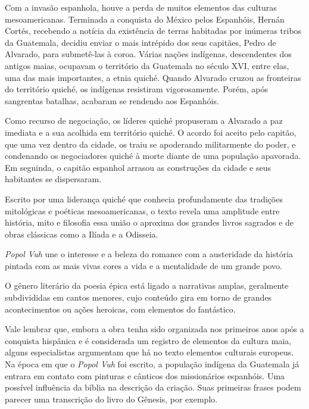 \documentclass[12pt]{extarticle}
\begin{document}
Com a invasão espanhola, houve a perda de muitos elementos das culturas mesoamericanas. Terminada a conquista do México pelos Espanhóis, Hernán Cortés, recebendo a notícia da existência de terras habitadas por inúmeras tribos da Guatemala, decidiu enviar o mais intrépido dos seus capitães, Pedro de Alvarado, para submetê-las à coroa.
Várias nações indígenas, descendentes dos antigos maias, ocupavam o território da Guatemala no século XVI, entre elas, uma das mais importantes, a etnia quiché. Quando Alvarado cruzou as fronteiras do território quiché, os indígenas resistiram vigorosamente. Porém, após sangrentas batalhas, acabaram se rendendo aos Espanhóis.

Como recurso de negociação, os líderes quiché propuseram a Alvarado a paz imediata e a sua acolhida em território quiché. O acordo foi aceito pelo capitão, que uma vez dentro da cidade, os traiu se apoderando militarmente do poder, e condenando os negociadores quiché à morte diante de uma população apavorada.
Em seguinda, o capitão espanhol arrasou as construções da cidade e seus habitantes se dispersaram.





Escrito por uma liderança quiché que conhecia profundamente das tradições mitológicas e poéticas mesoamericanas, o texto revela uma amplitude entre história, mito e filosofia essa união o aproxima dos grandes livros sagrados e de obras clássicas como a Ilíada e a Odisseia.

\textit{Popol Vuh} une o interesse e a beleza do romance com a austeridade da história pintada com as mais vivas cores a vida e a mentalidade de um grande povo.

O gênero literário da poesia épica está ligado a narrativas amplas, geralmente subdivididas em cantos menores, cujo conteúdo gira em torno de grandes acontecimentos ou ações heroicas, com elementos do fantástico.

Vale lembrar que, embora a obra tenha sido organizada nos primeiros anos após a conquista hispânica e é considerada um registro de elementos da cultura maia, alguns especialistas argumentam que há no texto elementos culturais europeus. 
Na época em que o \textit{Popol Vuh} foi escrito, a população indígena da Guatemala já entrara em contato com pinturas e cânticos dos missionários espanhóis.
Uma possível influência da bíblia na descrição da criação.
Suas primeiras frases podem parecer uma transcrição do livro do Gênesis, por exemplo. 
\end{document}
